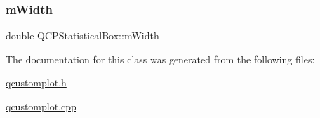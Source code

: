 \subsubsection{\texorpdfstring{m\+Width}{mWidth}}
{\footnotesize\ttfamily double Q\+C\+P\+Statistical\+Box\+::m\+Width\hspace{0.3cm}{\ttfamily [protected]}}



The documentation for this class was generated from the following files\+:\begin{DoxyCompactItemize}
\item 
\hyperlink{qcustomplot_8h}{qcustomplot.\+h}\item 
\hyperlink{qcustomplot_8cpp}{qcustomplot.\+cpp}\end{DoxyCompactItemize}
